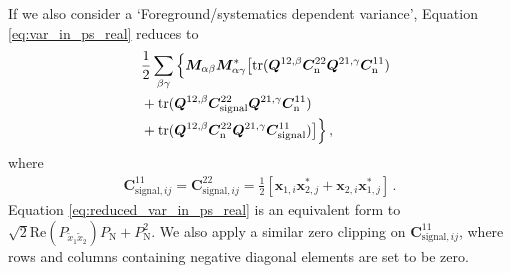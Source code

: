 \documentclass[12pt,a4paper]{article}
\begin{document}
If we also consider a `Foreground/systematics dependent variance', Equation \ref{eq:var_in_ps_real} reduces to
\begin{align}
\label{eq:reduced_var_in_ps_real}
    & \frac{1}{2} \sum_{\beta\gamma}
    \Big\{\bm{M}_{\alpha\beta} \bm{M}_{\alpha\gamma}^* \big[\text{tr}(\bm{Q}^{12,\beta} \bm{C}_\text{n}^{22} \bm{Q}^{21,\gamma} \bm{C}_\text{n}^{11})
    \notag \\
    \phantom{=} & + \text{tr}(\bm{Q}^{12,\beta} \bm{C}_\text{signal}^{22} \bm{Q}^{21,\gamma} \bm{C}_\text{n}^{11})
    \notag \\
    \phantom{=} & + \text{tr}(\bm{Q}^{12,\beta} \bm{C}_\text{n}^{22} \bm{Q}^{21,\gamma} \bm{C}_\text{signal}^{11}) \big]  \Big\}\,,
\end{align}
where
\begin{align}
    \bm{C}_{\text{signal}, ij}^{11} = \bm{C}_{\text{signal}, ij}^{22} = \frac{1}{2}\left[\bm{x}_{1,i} \bm{x}_{2,j}^* + \bm{x}_{2,i} \bm{x}_{1,j}^*\right]\,.
\end{align}
Equation \ref{eq:reduced_var_in_ps_real} is an equivalent form to $\sqrt{2}\text{Re} (P_{\tilde{x}_1\tilde{x}_2}) P_\text{N} + P_\text{N}^2$. We also apply a similar zero clipping on $\bm{C}_{\text{signal}, ij}^{11}$, where rows and columns containing negative diagonal elements are set to be zero.
\end{document}
